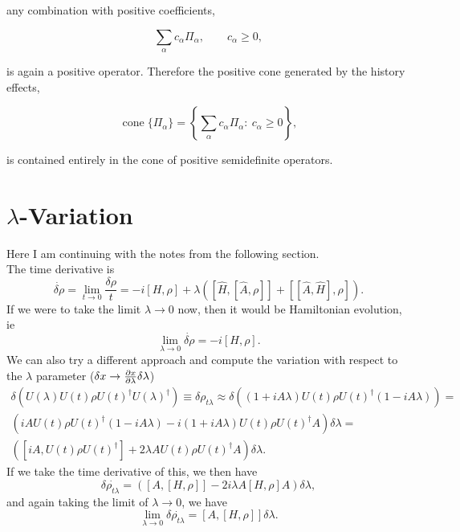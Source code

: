 \documentclass{article}
\begin{document}
any combination with positive coefficients,

$$
\sum_\alpha c_\alpha \Pi_\alpha,
\qquad c_\alpha\geq 0,
$$

is again a positive operator. Therefore the positive cone generated by the history effects,

$$
\operatorname{cone}\{\Pi_\alpha\}
=
\left\{
\sum_\alpha c_\alpha\Pi_\alpha:\ c_\alpha\geq0
\right\},
$$

is contained entirely in the cone of positive semidefinite operators.\\
\section{$\lambda$-Variation}
Here I am continuing with the notes from the following section.\\
The time derivative is 
\begin{equation}
\dot{\delta \rho}=\lim_{t\rightarrow 0} \frac{\delta \rho}{t} =-i[H, \rho] +  \lambda ([\hat H, [\hat A,\rho]]+[[\hat A,\hat{H}], \rho]).
\end{equation}
If we were to take the limit $\lambda\to0$ now, then it would be Hamiltonian evolution, ie
\begin{equation}
    \lim_{\lambda\rightarrow 0}\dot{\delta \rho}=-i[H, \rho].
\end{equation}
We can also try a different approach and compute the variation with respect to the $\lambda$ parameter ($\delta x\to\pdv{x}{\lambda}\delta\lambda$)
\begin{multline}
    \delta(U(\lambda)U(t)\rho U(t)^\dag U(\lambda)^\dag)\equiv \delta\rho_{t\lambda} \approx \delta((1+iA\lambda)U(t)\rho U(t)^\dag (1-iA\lambda)) = \\
    \left(iAU(t)\rho U(t)^\dag (1-iA\lambda) -i (1+iA\lambda)U(t)\rho U(t)^\dag A \right)\delta\lambda = \\
    \left([iA, U(t)\rho U(t)^\dag] + 2\lambda AU(t)\rho U(t)^\dag A\right )\delta\lambda.
\end{multline}
If we take the time derivative of this, we then have
\begin{equation}
    \delta\Dot{\rho_{t\lambda}} = \left([A,[H,\rho]] - 2i\lambda A[H,\rho]A\right)\delta\lambda, 
\end{equation}
and again taking the limit of $\lambda\to0$, we have
\begin{equation}
    \lim_{\lambda\to0}\delta\Dot{\rho_{t\lambda}} = [A,[H,\rho]]\delta\lambda.
\end{equation}
\end{document}
